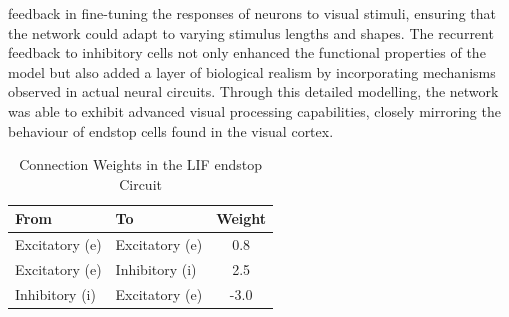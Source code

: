 \documentclass[12pt]{article}
\begin{document}
feedback in fine-tuning the responses of neurons to visual stimuli, ensuring that the network could adapt to varying stimulus lengths and shapes. The recurrent feedback to inhibitory cells not only enhanced the functional properties of the model but also added a layer of biological realism by incorporating mechanisms observed in actual neural circuits. Through this detailed modelling, the network was able to exhibit advanced visual processing capabilities, closely mirroring the behaviour of endstop cells found in the visual cortex.

\begin{table}[h]
  \centering
  \caption{Connection Weights in the LIF endstop Circuit}
  \begin{tabular}{@{}llc@{}}
      \toprule
      \textbf{From} & \textbf{To} & \textbf{Weight} \\ \midrule
      Excitatory (e) & Excitatory (e) & 0.8 \\
      Excitatory (e) & Inhibitory (i) & 2.5 \\
      Inhibitory (i) & Excitatory (e) & -3.0 \\ \bottomrule
  \end{tabular}
\end{table}
\end{document}
